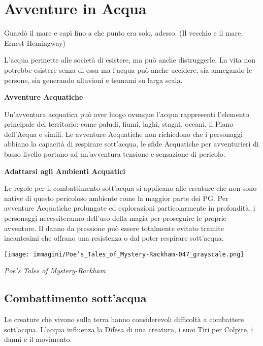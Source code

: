 \section{Avventure in Acqua}

\label{avventure-in-acqua}
\begin{enfasi}{
Guardò il mare e capì fino a che punto era solo, adesso. (Il vecchio e il mare, Ernest Hemingway)}\end{enfasi}

\begin{multicols}{2}

L'acqua permette alle società di esistere, ma può anche distruggerle. La vita non potrebbe esistere senza di essa ma l'acqua può anche uccidere, sia annegando le persone, sia generando alluvioni e tsunami su larga scala.

\textbf{Avventure Acquatiche}

Un'avventura acquatica può aver luogo ovunque l'acqua rappresenti l'elemento principale del territorio: come paludi, fiumi, laghi, stagni, oceani, il Piano dell'Acqua e simili. Le avventure Acquatiche non richiedono che i personaggi abbiano la capacità di respirare sott'acqua, le sfide Acquatiche per avventurieri di basso livello portano ad un'avventura tensione e sensazione di pericolo.

\textbf{Adattarsi agli Ambienti Acquatici}

Le regole per il combattimento sott'acqua si applicano alle creature che non sono native di questo pericoloso ambiente come la maggior parte dei PG. Per avventure Acquatiche prolungate ed esplorazioni particolarmente in profondità, i personaggi necessiteranno dell'uso della magia per proseguire le proprie avventure. Il danno da pressione può essere totalmente evitato tramite incantesimi che offrano una resistenza o dal poter respirare sott'acqua.

\medskip

\begin{center}


\texttt{[image: immagini/Poe's\_Tales\_of\_Mystery-Rackham-047\_grayscale.png]}

\emph{Poe's Tales of Mystery-Rackham}
\end{center}

\subsection{Combattimento sott'acqua}\label{combatteresottacqua}\hypertarget{combatteresottacqua}{}
Le creature che vivono sulla terra hanno considerevoli difficoltà a combattere sott'acqua. L'acqua influenza la Difesa di una creatura, i suoi Tiri per Colpire, i danni e il movimento.


\end{multicols}
